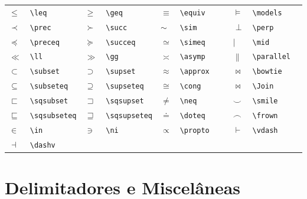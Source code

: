 \documentclass[fleqn]{icat-ufal}
\begin{document}
\begin{spacing}{1}
\begin{longtable}{p{4mm}p{28mm}p{4mm}p{28mm}p{4mm}p{28mm}p{4mm}p{24mm}} \hline
  $\leq       $ & \lstinline!\leq       ! &
  $\geq       $ & \lstinline!\geq       ! &
  $\equiv     $ & \lstinline!\equiv     ! &
  $\models    $ & \lstinline!\models    ! \\
  $\prec      $ & \lstinline!\prec      ! &
  $\succ      $ & \lstinline!\succ      ! &
  $\sim       $ & \lstinline!\sim       ! &
  $\perp      $ & \lstinline!\perp      ! \\
  $\preceq    $ & \lstinline!\preceq    ! &
  $\succeq    $ & \lstinline!\succeq    ! &
  $\simeq     $ & \lstinline!\simeq     ! &
  $\mid       $ & \lstinline!\mid       ! \\
  $\ll        $ & \lstinline!\ll        ! &
  $\gg        $ & \lstinline!\gg        ! &
  $\asymp     $ & \lstinline!\asymp     ! &
  $\parallel  $ & \lstinline!\parallel  ! \\
  $\subset    $ & \lstinline!\subset    ! &
  $\supset    $ & \lstinline!\supset    ! &
  $\approx    $ & \lstinline!\approx    ! &
  $\bowtie    $ & \lstinline!\bowtie    ! \\
  $\subseteq  $ & \lstinline!\subseteq  ! &
  $\supseteq  $ & \lstinline!\supseteq  ! &
  $\cong      $ & \lstinline!\cong      ! &
  $\Join      $ & \lstinline!\Join      ! \\
  $\sqsubset  $ & \lstinline!\sqsubset  ! &
  $\sqsupset  $ & \lstinline!\sqsupset  ! &
  $\neq       $ & \lstinline!\neq       ! &
  $\smile     $ & \lstinline!\smile     ! \\
  $\sqsubseteq$ & \lstinline!\sqsubseteq! &
  $\sqsupseteq$ & \lstinline!\sqsupseteq! &
  $\doteq     $ & \lstinline!\doteq     ! &
  $\frown     $ & \lstinline!\frown     ! \\
  $\in        $ & \lstinline!\in        ! &
  $\ni        $ & \lstinline!\ni        ! &
  $\propto    $ & \lstinline!\propto    ! &
  $\vdash     $ & \lstinline!\vdash     ! \\
  $\dashv     $ & \lstinline!\dashv     ! \\ \hline
\end{longtable}

\section{Delimitadores e Miscelâneas}


\end{spacing}
\end{document}
